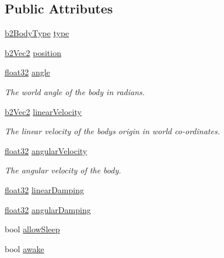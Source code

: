 \subsection*{Public Attributes}
\begin{DoxyCompactItemize}
\item 
\mbox{\hyperlink{b2_body_8h_a74ddb02261648c2bff691a866b5c03e0}{b2\+Body\+Type}} \mbox{\hyperlink{structb2_body_def_a89cc3ad1873908042b002147b3861381}{type}}
\item 
\mbox{\hyperlink{structb2_vec2}{b2\+Vec2}} \mbox{\hyperlink{structb2_body_def_a680cadc09ad6cf4b3366cbf0914c648b}{position}}
\item 
\mbox{\hyperlink{b2_settings_8h_aacdc525d6f7bddb3ae95d5c311bd06a1}{float32}} \mbox{\hyperlink{structb2_body_def_a564b16f4f8e9fcb5dda397e64aa9be6f}{angle}}
\begin{DoxyCompactList}\small\item\em The world angle of the body in radians. \end{DoxyCompactList}\item 
\mbox{\hyperlink{structb2_vec2}{b2\+Vec2}} \mbox{\hyperlink{structb2_body_def_a25fa5aa78d93159c344241af95bec2bf}{linear\+Velocity}}
\begin{DoxyCompactList}\small\item\em The linear velocity of the body\textquotesingle{}s origin in world co-\/ordinates. \end{DoxyCompactList}\item 
\mbox{\hyperlink{b2_settings_8h_aacdc525d6f7bddb3ae95d5c311bd06a1}{float32}} \mbox{\hyperlink{structb2_body_def_add7809f7a29656b8c4b643ad8c2f34a9}{angular\+Velocity}}
\begin{DoxyCompactList}\small\item\em The angular velocity of the body. \end{DoxyCompactList}\item 
\mbox{\hyperlink{b2_settings_8h_aacdc525d6f7bddb3ae95d5c311bd06a1}{float32}} \mbox{\hyperlink{structb2_body_def_a728f6df3be7dedb331455105e3659d46}{linear\+Damping}}
\item 
\mbox{\hyperlink{b2_settings_8h_aacdc525d6f7bddb3ae95d5c311bd06a1}{float32}} \mbox{\hyperlink{structb2_body_def_a01b8dc8ad9f0962efef9e4a8e836feb6}{angular\+Damping}}
\item 
bool \mbox{\hyperlink{structb2_body_def_a0765068172e521ed63cb34084c59c003}{allow\+Sleep}}
\item 
bool \mbox{\hyperlink{structb2_body_def_a17a8102638aac41e7ab94278651a45bd}{awake}}

\end{DoxyCompactItemize}
